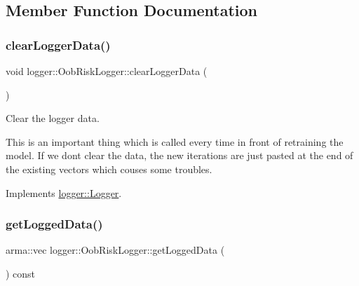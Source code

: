 \subsection{Member Function Documentation}
\mbox{\label{classlogger_1_1_oob_risk_logger_ac1d85a315dc9b6c1897a3164f4997207}} 
\subsubsection{\texorpdfstring{clear\+Logger\+Data()}{clearLoggerData()}}
{\footnotesize\ttfamily void logger\+::\+Oob\+Risk\+Logger\+::clear\+Logger\+Data (\begin{DoxyParamCaption}{ }\end{DoxyParamCaption})\hspace{0.3cm}{\ttfamily [virtual]}}



Clear the logger data. 

This is an important thing which is called every time in front of retraining the model. If we don\textquotesingle{}t clear the data, the new iterations are just pasted at the end of the existing vectors which couses some troubles. 

Implements \mbox{\hyperlink{classlogger_1_1_logger_a8c68db2430fa84b67528bfa6ae45a516}{logger\+::\+Logger}}.

\mbox{\label{classlogger_1_1_oob_risk_logger_a74bfab14d3da0b10229c1ae99ab11337}} 
\subsubsection{\texorpdfstring{get\+Logged\+Data()}{getLoggedData()}}
{\footnotesize\ttfamily arma\+::vec logger\+::\+Oob\+Risk\+Logger\+::get\+Logged\+Data (\begin{DoxyParamCaption}{ }\end{DoxyParamCaption}) const\hspace{0.3cm}{\ttfamily [virtual]}}



